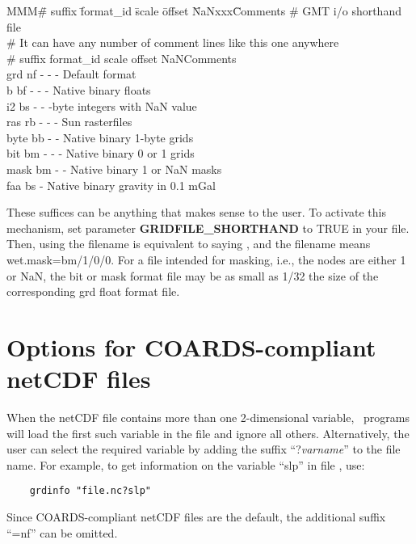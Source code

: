 \noindent
\begin{tabbing}
MMM\=\# suffix \=format\_id \=scale \=offset \=NaNxxx\=Comments \kill 
\>\# GMT i/o shorthand file \\ 
\>\# It can have any number of comment lines like this one anywhere \\
\>\# suffix \> format\_id	\> scale \> offset \>NaN\>Comments \\ 
\>grd \> nf \> - \> - \> - \>Default format \\ 
\>b \> bf \> - \> - \> - \> Native binary floats \\ 
\>i2 \> bs \> - \> -  -byte integers with NaN value \\ 
\>ras \> rb \> - \> - \> - \> Sun rasterfiles \\ 
\>byte \> bb \> - \> -  \> Native binary 1-byte grids \\ 
\>bit \> bm \> - \> - \> - \> Native binary 0 or 1 grids \\ 
\>mask \> bm \> - \> -  \> Native binary 1 or NaN masks \\ 
\>faa \> bs  \> -  \> Native binary gravity in 0.1 mGal
\end{tabbing} 

These suffices can be anything that makes sense to the user.  To
activate this mechanism, set parameter \textbf{GRIDFILE\_SHORTHAND} to TRUE in
your  file.  Then, using the filename
 is equivalent to saying ,
and the filename  means wet.mask=bm/1/0/0.  For a
file intended for masking, i.e., the nodes are either 1 or NaN,
the bit or mask format file may be as small as 1/32 the size of the
corresponding grd float format file. 

\section{Options for COARDS-compliant netCDF files}
\label{sec:netcdf}

When the netCDF file contains more than one 2-dimensional variable, \GMT\ programs
will load the first such variable in the file and ignore all others. Alternatively,
the user can select the
required variable by adding the suffix ``?\emph{varname}'' to the file name. For example,
to get information on the variable ``slp'' in file , use:
\begin{verbatim}
	grdinfo "file.nc?slp"
\end{verbatim}
Since COARDS-compliant netCDF files are the default, the additional suffix ``=nf'' can be omitted.

